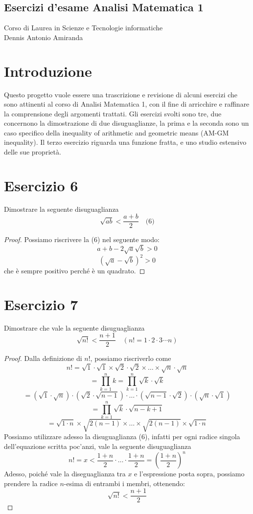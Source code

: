 \documentclass{article}
\begin{document}
\begin{center}
\section*{Esercizi d’esame Analisi Matematica 1}
Corso di Laurea in Scienze e Tecnologie informatiche\\
Dennis Antonio Amiranda
\end{center}

\section*{Introduzione }
Questo progetto vuole essere una trascrizione e revisione di alcuni esercizi che sono attinenti al corso di Analisi Matematica 1, con il fine di arricchire e raffinare la comprensione degli argomenti trattati. Gli esercizi svolti sono tre, due concernono la dimostrazione di due disuguaglianze, la prima e la seconda sono un caso specifico della inequality of arithmetic and geometric means (AM-GM inequality). Il terzo esercizio riguarda una funzione fratta, e uno studio estensivo delle sue proprietà.

\section*{Esercizio 6}
Dimostrare la seguente disuguaglianza
\[
\sqrt{ab} < \frac{a+b}{2} \quad \text{(6)}
\]
\begin{proof}
    Possiamo riscrivere la (6) nel seguente modo:
    \[
    a + b - 2\sqrt{a}\sqrt{b} > 0
    \]
    \[
    (\sqrt{a} - \sqrt{b})^2 > 0
    \]
    che è sempre positivo perché è un quadrato.
\end{proof}

\section*{Esercizio 7}
Dimostrare che vale la seguente disuguaglianza
\[
\sqrt{n!} < \frac{n+1}{2} \quad (n! = 1 \cdot 2 \cdot 3 \cdots n)
\]
\begin{proof}
    Dalla definizione di \(n!\), possiamo riscriverlo come
    \[
    n! = \sqrt{1} \cdot \sqrt{1} \times \sqrt{2} \cdot \sqrt{2} \times \ldots \times \sqrt{n} \cdot \sqrt{n}
    \]
    \[
    = \prod_{k=1}^{n} k = \prod_{k=1}^{n} \sqrt{k} \cdot \sqrt{k}
    \]
    \[
    = (\sqrt{1} \cdot \sqrt{n}) \cdot (\sqrt{2} \cdot \sqrt{n-1}) \cdot \ldots \cdot (\sqrt{n-1} \cdot \sqrt{2}) \cdot (\sqrt{n} \cdot \sqrt{1})
    \]
    \[
    = \prod_{k=1}^{n} \sqrt{k} \cdot \sqrt{n-k+1}
    \]
    \[
    = \sqrt{1 \cdot n} \times \sqrt{2(n-1)} \times \ldots \times \sqrt{2(n-1)} \times \sqrt{1 \cdot n} 
    \]
    Possiamo utilizzare adesso la disuguaglianza (6), infatti per ogni radice singola dell’equazione scritta poc’anzi, vale la seguente disuguaglianza
    \[
    n! = x < \frac{1+n}{2} \cdot \ldots \cdot \frac{1+n}{2} = \left(\frac{1+n}{2}\right)^n
    \]
    Adesso, poiché vale la diseguaglianza tra \(x\) e l’espressione posta sopra, possiamo prendere la radice \(n\)-esima di entrambi i membri, ottenendo:
    \[
    \sqrt{n!} < \frac{n+1}{2}
    \]
\end{proof}
\end{document}
